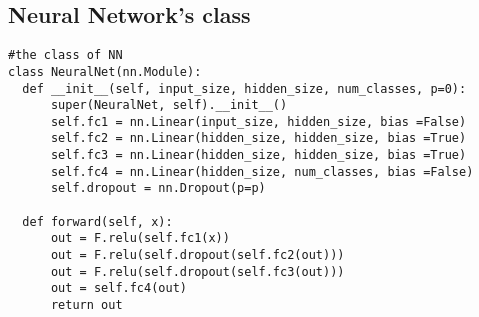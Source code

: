 \subsection{Neural Network's class}
\begin{Verbatim}[fontsize=\tiny]
#the class of NN
class NeuralNet(nn.Module):
  def __init__(self, input_size, hidden_size, num_classes, p=0):
      super(NeuralNet, self).__init__()
      self.fc1 = nn.Linear(input_size, hidden_size, bias =False)
      self.fc2 = nn.Linear(hidden_size, hidden_size, bias =True)
      self.fc3 = nn.Linear(hidden_size, hidden_size, bias =True)
      self.fc4 = nn.Linear(hidden_size, num_classes, bias =False)
      self.dropout = nn.Dropout(p=p)

  def forward(self, x):
      out = F.relu(self.fc1(x))
      out = F.relu(self.dropout(self.fc2(out)))
      out = F.relu(self.dropout(self.fc3(out)))
      out = self.fc4(out)
      return out
\end{Verbatim}






